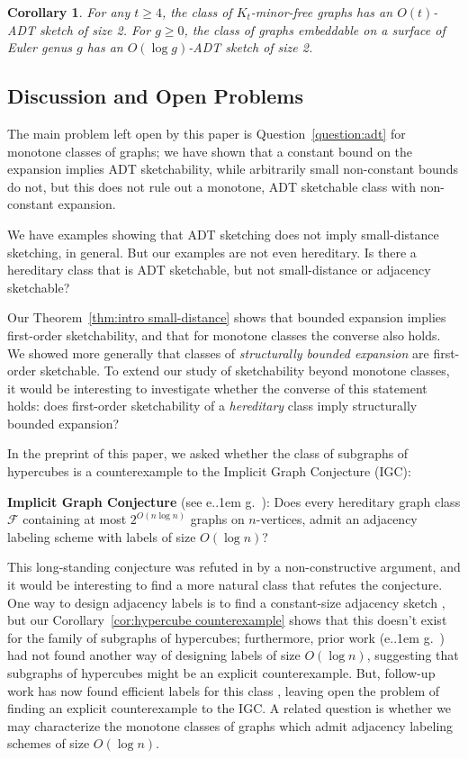 \documentclass[11pt]{article}
\newcommand*\eg{e.\kern.1em g.\ }
\newtheorem{corollary}[thm]{Corollary}
\theoremstyle{definition}
\renewcommand{\geq}{\geqslant}
\def\F {{\mathcal F}}
\begin{document}
\begin{corollary}
For any $t \geq 4$, the class of $K_t$-minor-free graphs has an $O(t)$-ADT sketch of size 2. For $g
\geq 0$, the class of graphs embeddable on a surface of Euler genus $g$ has an $O(\log g)$-ADT
sketch of size 2.
\end{corollary}

\subsection{Discussion and Open Problems}

The main problem left open by this paper is Question~\ref{question:adt} for monotone
classes of graphs; we have shown that a constant bound on the expansion implies ADT sketchability,
while arbitrarily small non-constant bounds do not, but this does not rule out a monotone, ADT
sketchable class with non-constant expansion.

We have examples showing that ADT sketching does not imply small-distance
sketching, in general. But our examples are not even hereditary. Is there a hereditary class
that is ADT sketchable, but not small-distance or adjacency sketchable?

Our Theorem~\ref{thm:intro small-distance} shows that bounded expansion implies first-order
sketchability, and that for monotone classes the converse also holds. We showed more generally that
classes of \emph{structurally bounded expansion} are first-order sketchable. To extend our study of
sketchability beyond monotone classes, it would be interesting to investigate whether the converse
of this statement holds: does first-order sketchability of a \emph{hereditary} class imply
structurally bounded expansion?

In the preprint of this paper, we asked whether the class of subgraphs of hypercubes is a
counterexample to the Implicit Graph Conjecture (IGC):

\noindent
\textbf{Implicit Graph Conjecture} (see \eg \cite{KNR92,Spin03}): Does every hereditary graph class
$\F$ containing at most $2^{O(n \log n)}$ graphs on $n$-vertices, admit an adjacency labeling scheme
with labels of size $O(\log n)$?

\noindent
This long-standing conjecture was refuted in \cite{HH21} by a non-constructive argument, and
it would be interesting to find a more natural class that refutes the conjecture. One way to design
adjacency labels is to find a constant-size adjacency sketch \cite{Har20,HWZ21}, but our
Corollary~\ref{cor:hypercube counterexample} shows that this doesn't exist for the family of
subgraphs of hypercubes; furthermore, prior work (\eg \cite{CLR20}) had not found another way of
designing labels of size $O(\log n)$, suggesting that subgraphs of hypercubes might be
an explicit counterexample. But, follow-up work has now found efficient labels for this class
\cite{EHZ22}, leaving open the problem of finding an explicit counterexample to the IGC.  A related
question is whether we may characterize the monotone classes of graphs which admit adjacency
labeling schemes of size $O(\log n)$.
\end{document}
